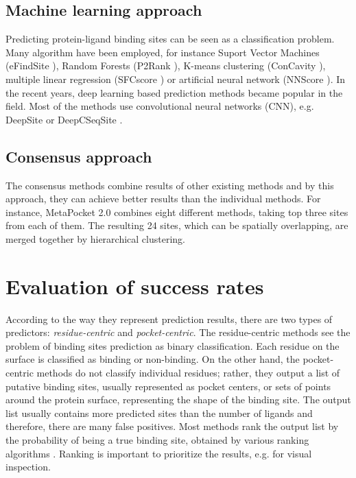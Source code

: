 \subsection{Machine learning approach}
Predicting protein-ligand binding sites can be seen as a classification problem. Many algorithm have been employed, for instance Suport Vector Machines (eFindSite \cite{efindsite}), Random Forests (P2Rank \cite{p2rank1}), K-means clustering (ConCavity \cite{concavity}), multiple linear regression (SFCscore \cite{sfcscore}) or artificial neural network (NNScore \cite{nnscore}). In the recent years, deep learning based prediction methods became popular in the field. Most of the methods use convolutional neural networks (CNN), e.g. DeepSite \cite{deepsite} or DeepCSeqSite \cite{deepcseqsite}.

\subsection{Consensus approach}
The consensus methods combine results of other existing methods and by this approach, they can achieve better results than the individual methods. For instance, MetaPocket 2.0 \cite{metapocket} combines eight different methods, taking top three sites from each of them. The resulting 24 sites, which can be spatially overlapping, are merged together by hierarchical clustering.


\section{Evaluation of success rates}

According to the way they represent prediction results, there are two types of predictors: \textit{residue-centric} and \textit{pocket-centric}. The residue-centric methods see the problem of binding sites prediction as binary classification. Each residue on the surface is classified as binding or non-binding. On the other hand, the pocket-centric methods do not classify individual residues; rather, they output a list of putative binding sites, usually represented as pocket centers, or sets of points around the protein surface, representing the shape of the binding site. The output list usually contains more predicted sites than the number of ligands and therefore, there are many false positives. Most methods rank the output list by the probability of being a true binding site, obtained by various ranking algorithms \cite{p2rank1}. Ranking is important to prioritize the results, e.g. for visual inspection.


